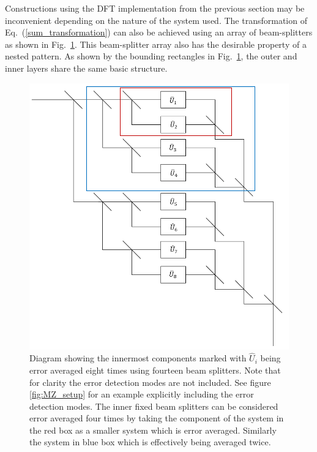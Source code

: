 \documentclass[aps,pra,twocolumn,superscriptaddress,numerical]{revtex4-1}
\begin{document}
Constructions using the DFT implementation from the previous section may be inconvenient depending on the nature of the system used.  The transformation of Eq.~(\ref{sum_transformation}) can also be achieved using an array of beam-splitters as shown in Fig.~\ref{fig:gen system}.  This beam-splitter array also has the desirable property of a nested pattern.  As shown by the bounding rectangles in Fig.~\ref{fig:gen system}, the outer and inner layers share the same basic structure. 
%
\begin{figure}
	\includegraphics[width=\columnwidth]{unitaries.PNG}
	\caption{\label{fig:gen system}Diagram showing the innermost components marked with $\hat{U}_i$ being error averaged eight times using fourteen beam splitters. Note that for clarity the error detection modes are not included. See figure \ref{fig:MZ_setup} for an example explicitly including the error detection modes. The inner fixed beam splitters can be considered error averaged four times by taking the component of the system in the red box as a smaller system which is error averaged. Similarly the system in blue box which is effectively being averaged twice.}
\end{figure}
	
	
\end{document}
